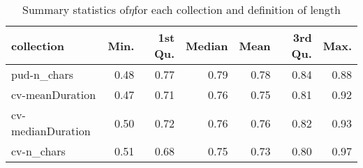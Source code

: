\begin{table}[H]
\centering
\caption{Summary statistics of$\eta$for each collection and definition of length} 
\label{tab:opt_scores_summary_eta}
\begin{tabular}{lrrrrrr}
  \hline
collection & Min. & 1st Qu. & Median & Mean & 3rd Qu. & Max. \\ 
  \hline
pud-n_chars & 0.48 & 0.77 & 0.79 & 0.78 & 0.84 & 0.88 \\ 
  cv-meanDuration & 0.47 & 0.71 & 0.76 & 0.75 & 0.81 & 0.92 \\ 
  cv-medianDuration & 0.50 & 0.72 & 0.76 & 0.76 & 0.82 & 0.93 \\ 
  cv-n_chars & 0.51 & 0.68 & 0.75 & 0.73 & 0.80 & 0.97 \\ 
   \hline
\end{tabular}
\end{table}
